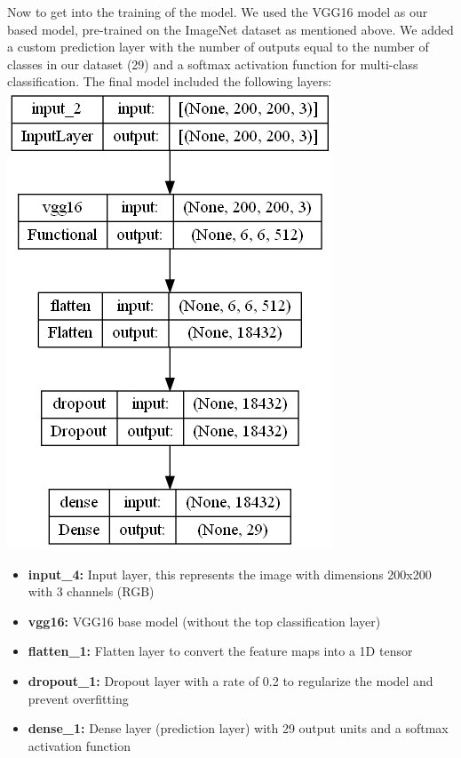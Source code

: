 \documentclass[12pt]{article}
\begin{document}
Now to get into the training of the model. We used the VGG16 model as our based model, pre-trained on the ImageNet dataset as mentioned above. 
We added a custom prediction layer with the number of outputs equal to the number of classes in our dataset (29) and a softmax
activation function for multi-class classification. The final model included the following layers:\\
\includegraphics*[scale=0.4]{images/model_plot.png}\\
\begin{itemize}
    \item \textbf{input\_4:} Input layer, this represents the image with dimensions 200x200 with 3 channels (RGB)
    \item \textbf{vgg16:} VGG16 base model (without the top classification layer)
    \item \textbf{flatten\_1:} Flatten layer to convert the feature maps into a 1D tensor
    \item \textbf{dropout\_1:} Dropout layer with a rate of 0.2 to regularize the model and prevent overfitting
    \item \textbf{dense\_1:} Dense layer (prediction layer) with 29 output units and a softmax activation function
\end{itemize}
\end{document}
